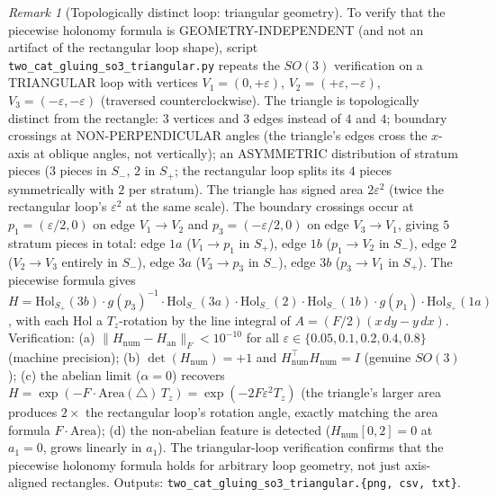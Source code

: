 \documentclass[11pt,a4paper]{article}
\theoremstyle{plain}
\theoremstyle{definition}
\theoremstyle{remark}
\newtheorem{remark}[theorem]{Remark}
\begin{document}
\begin{remark}[Topologically distinct loop: triangular geometry]
\label{rem:2cat-gluing-so3-triangular}
To verify that the piecewise holonomy formula is
GEOMETRY-INDEPENDENT (and not an artifact of the rectangular loop
shape), script \texttt{two\_cat\_gluing\_so3\_triangular.py} repeats
the $SO(3)$ verification on a TRIANGULAR loop with vertices
$V_1 = (0, +\varepsilon)$, $V_2 = (+\varepsilon, -\varepsilon)$,
$V_3 = (-\varepsilon, -\varepsilon)$ (traversed counterclockwise). The
triangle is topologically distinct from the rectangle: $3$ vertices and
$3$ edges instead of $4$ and $4$; boundary crossings at
NON-PERPENDICULAR angles (the triangle's edges cross the $x$-axis at
oblique angles, not vertically); an ASYMMETRIC distribution of stratum
pieces ($3$ pieces in $S_-$, $2$ in $S_+$; the rectangular loop splits
its $4$ pieces symmetrically with $2$ per stratum). The triangle has
signed area $2\varepsilon^2$ (twice the rectangular loop's $\varepsilon^2$
at the same scale). The boundary crossings occur at $p_1 = (\varepsilon/2,
0)$ on edge $V_1 \to V_2$ and $p_3 = (-\varepsilon/2, 0)$ on edge $V_3
\to V_1$, giving $5$ stratum pieces in total: edge $1a$ ($V_1 \to p_1$
in $S_+$), edge $1b$ ($p_1 \to V_2$ in $S_-$), edge $2$ ($V_2 \to V_3$
entirely in $S_-$), edge $3a$ ($V_3 \to p_3$ in $S_-$), edge $3b$ ($p_3
\to V_1$ in $S_+$). The piecewise formula gives $H = \mathrm{Hol}_{S_+}(3b)
\cdot g(p_3)^{-1} \cdot \mathrm{Hol}_{S_-}(3a) \cdot
\mathrm{Hol}_{S_-}(2) \cdot \mathrm{Hol}_{S_-}(1b) \cdot g(p_1) \cdot
\mathrm{Hol}_{S_+}(1a)$, with each $\mathrm{Hol}$ a $T_z$-rotation by the
line integral of $A = (F/2)(x\,dy - y\,dx)$. Verification: (a)
$\|H_{\mathrm{num}} - H_{\mathrm{an}}\|_F < 10^{-10}$ for all $\varepsilon
\in \{0.05, 0.1, 0.2, 0.4, 0.8\}$ (machine precision); (b)
$\det(H_{\mathrm{num}}) = +1$ and $H_{\mathrm{num}}^\top H_{\mathrm{num}}
= I$ (genuine $SO(3)$); (c) the abelian limit ($\alpha = 0$) recovers
$H = \exp(-F \cdot \mathrm{Area}(\triangle) \,T_z) = \exp(-2 F
\varepsilon^2 T_z)$ (the triangle's larger area produces $2\times$ the
rectangular loop's rotation angle, exactly matching the area formula
$F \cdot \mathrm{Area}$); (d) the non-abelian feature is detected
($H_{\mathrm{num}}[0,2] = 0$ at $a_1 = 0$, grows linearly in $a_1$).
The triangular-loop verification confirms that the piecewise holonomy
formula holds for arbitrary loop geometry, not just axis-aligned
rectangles. Outputs:
\texttt{two\_cat\_gluing\_so3\_triangular.\{png, csv, txt\}}.
\end{remark}
\end{document}
